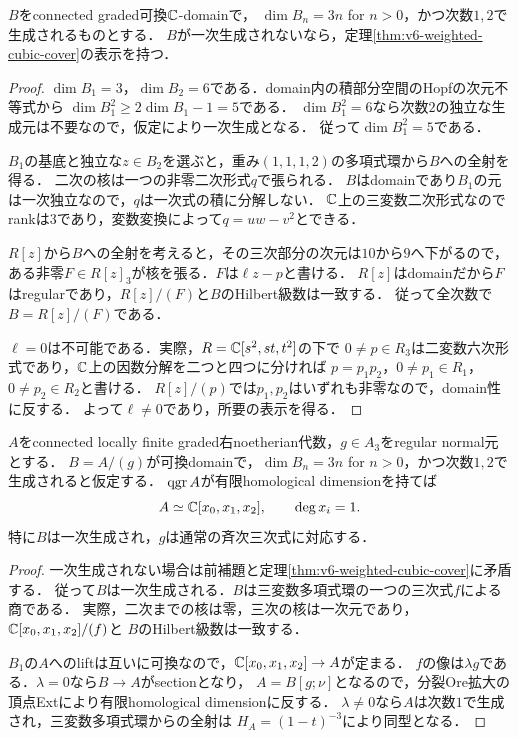 \documentclass[11pt,a4paper]{ltjsarticle}
\begin{document}
\begin{lemma}[二次までで生成される可換境界の表示]
\label{lem:v6-commutative-boundary-presentation}
$B$をconnected graded可換$\mathbb C$-domainで，
$\dim B_n=3n$ for $n>0$，かつ次数$1,2$で生成されるものとする．
$B$が一次生成されないなら，定理\ref{thm:v6-weighted-cubic-cover}の表示を持つ．
\end{lemma}
\begin{proof}
$\dim B_1=3$，$\dim B_2=6$である．domain内の積部分空間のHopfの次元不等式から
$\dim B_1^2\geq2\dim B_1-1=5$である．
$\dim B_1^2=6$なら次数$2$の独立な生成元は不要なので，仮定により一次生成となる．
従って$\dim B_1^2=5$である．

$B_1$の基底と独立な$z\in B_2$を選ぶと，重み$(1,1,1,2)$の多項式環から$B$への全射を得る．
二次の核は一つの非零二次形式$q$で張られる．
$B$はdomainであり$B_1$の元は一次独立なので，$q$は一次式の積に分解しない．
$\mathbb C$上の三変数二次形式なのでrankは$3$であり，変数変換によって$q=uw-v^2$とできる．

$R[z]$から$B$への全射を考えると，その三次部分の次元は$10$から$9$へ下がるので，
ある非零$F\in R[z]_3$が核を張る．$F$は$\ell z-p$と書ける．
$R[z]$はdomainだから$F$はregularであり，$R[z]/(F)$と$B$のHilbert級数は一致する．
従って全次数で$B=R[z]/(F)$である．

$\ell=0$は不可能である．実際，$R=\mathbb C[s^2,st,t^2]$の下で
$0\ne p\in R_3$は二変数六次形式であり，$\mathbb C$上の因数分解を二つと四つに分ければ
$p=p_1p_2$，$0\ne p_1\in R_1$，$0\ne p_2\in R_2$と書ける．
$R[z]/(p)$では$p_1,p_2$はいずれも非零なので，domain性に反する．
よって$\ell\ne0$であり，所要の表示を得る．
\end{proof}

\begin{corollary}[二次までで生成される可換三次境界からの認識]
\label{cor:v6-commutative-degree-two-recognition}
$A$をconnected locally finite graded右noetherian代数，$g\in A_3$をregular normal元とする．
$B=A/(g)$が可換domainで，$\dim B_n=3n$ for $n>0$，かつ次数$1,2$で生成されると仮定する．
$\operatorname{qgr} A$が有限homological dimensionを持てば
\[
 A\simeq\mathbb C[x_0,x_1,x_2],\qquad\deg x_i=1.
\]
特に$B$は一次生成され，$g$は通常の斉次三次式に対応する．
\end{corollary}
\begin{proof}
一次生成されない場合は前補題と定理\ref{thm:v6-weighted-cubic-cover}に矛盾する．
従って$B$は一次生成される．$B$は三変数多項式環の一つの三次式$f$による商である．
実際，二次までの核は零，三次の核は一次元であり，$\mathbb C[x_0,x_1,x_2]/(f)$と
$B$のHilbert級数は一致する．

$B_1$の$A$へのliftは互いに可換なので，$\mathbb C[x_0,x_1,x_2]\to A$が定まる．
$f$の像は$\lambda g$である．$\lambda=0$なら$B\to A$がsectionとなり，
$A=B[g;\nu]$となるので，分裂Ore拡大の頂点Extにより有限homological dimensionに反する．
$\lambda\ne0$なら$A$は次数$1$で生成され，三変数多項式環からの全射は
$H_A=(1-t)^{-3}$により同型となる．
\end{proof}
\end{document}
